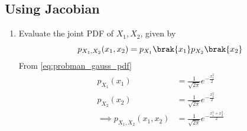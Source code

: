 \subsection{Using Jacobian}
%
\begin{enumerate}[label=\thesubsection.\arabic*.,ref=\thesubsection.\theenumi]

\item
Evaluate the joint PDF of $X_1,X_2$,  given by
%
\begin{equation}
p_{X_1,X_2}(x_1,x_2) = p_{X_1}\brak{x_1}p_{X_2}\brak{x_2}
\end{equation}
%
\solution From \eqref{eq:probman_gauss_pdf}
\begin{align}
p_{X_1}(x_1)&=\frac {1}{\sqrt {2\pi }}e^{-\frac {x_1^2}{2}}
\\
p_{X_2}(x_2)&=\frac {1}{\sqrt {2\pi }}e^{-\frac {x_2^2}{2}}
\\
\implies p_{X_1,X_2}(x_1,x_2) &= \frac {1}{\sqrt {2\pi }}e^{-\frac {x_1^2+x_2^2}{2}}
\label{eq:probman_pdf_x1x2}
\end{align}
 

\end{enumerate}
